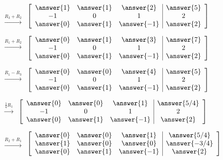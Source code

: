 \documentclass{ximera}
\begin{document}
\begin{problem}
\begin{problem}
\begin{center}
 
$ \begin{array}{c}
 \\
 \\
 \xrightarrow{R_3+R_2}
\end{array}$
$\left[\begin{array}{ccc|c}  
 \answer{1}&\answer{1}&\answer{2}&\answer{5}\\-1&0&1&2\\\answer{0}&\answer{1}&\answer{-1}&\answer{2}
 \end{array}\right]$
 
 
$ \begin{array}{c}
 \xrightarrow{R_1+R_2}\\
  \\
\\
\end{array}$
$\left[\begin{array}{ccc|c}  
 \answer{0}&\answer{1}&\answer{3}&\answer{7}\\-1&0&1&2\\\answer{0}&\answer{1}&\answer{-1}&\answer{2}
 \end{array}\right]$
 
 
$ \begin{array}{c}
 \xrightarrow{R_1-R_3}\\
\\
\\
\end{array}$
$\left[\begin{array}{ccc|c}  
 \answer{0}&\answer{0}&\answer{4}&\answer{5}\\-1&0&1&2\\\answer{0}&\answer{1}&\answer{-1}&\answer{2}
 \end{array}\right]$
 
 
$ \begin{array}{c}
 \xrightarrow{\frac{1}{4}R_1}\\
 \\
\\
\end{array}$
$\left[\begin{array}{ccc|c}  
\answer{0}&\answer{0}&\answer{1}&\answer{5/4}\\-1&0&1&2\\\answer{0}&\answer{1}&\answer{-1}&\answer{2}
 \end{array}\right]$
 
 
$ \begin{array}{c}
 \\
 \xrightarrow{R_2+R_1}\\
 \\
\end{array}$
$\left[\begin{array}{ccc|c}  
 \answer{0}&\answer{0}&\answer{1}&\answer{5/4}\\\answer{1}&\answer{0}&\answer{0}&\answer{-3/4}\\\answer{0}&\answer{1}&\answer{-1}&\answer{2}
 \end{array}\right]$
 

\end{center}
\end{problem}
\end{problem}
\end{document}
